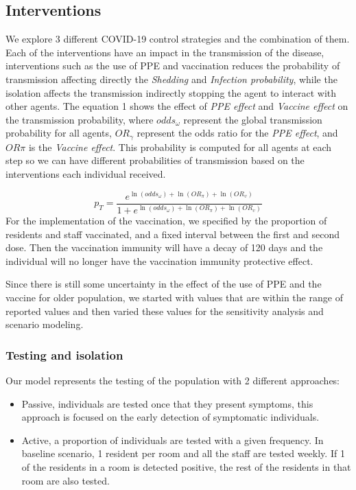 \documentclass[
]{article}
\providecommand{\tightlist}{%
  \setlength{\itemsep}{0pt}\setlength{\parskip}{0pt}}
\begin{document}
\hypertarget{interventions}{%
\subsection{Interventions}\label{interventions}}

We explore 3 different COVID-19 control strategies and the combination
of them. Each of the interventions have an impact in the transmission of
the disease, interventions such as the use of PPE and vaccination
reduces the probability of transmission affecting directly the
\emph{Shedding} and \emph{Infection probability}, while the isolation
affects the transmission indirectly stopping the agent to interact with
other agents. The equation 1 shows the effect of \emph{PPE effect} and
\emph{Vaccine effect} on the transmission probability, where
\(odds_\omega\) represent the global transmission probability for all
agents, \(OR_\gamma\) represent the odds ratio for the \emph{PPE
effect}, and \(OR\pi\) is the \emph{Vaccine effect}. This probability is
computed for all agents at each step so we can have different
probabilities of transmission based on the interventions each individual
received.

\[p_T = \frac{e^{\ln(odds_\omega) + \ln(OR_\pi)+ \ln(OR_\upsilon)}}{1 + e^{\ln(odds_\omega) + \ln(OR_\pi)+ \ln(OR_\upsilon)}}\]
For the implementation of the vaccination, we specified by the
proportion of residents and staff vaccinated, and a fixed interval
between the first and second dose. Then the vaccination immunity will
have a decay of 120 days and the individual will no longer have the
vaccination immunity protective effect.

Since there is still some uncertainty in the effect of the use of PPE
and the vaccine for older population, we started with values that are
within the range of reported values and then varied these values for the
sensitivity analysis and scenario modeling.

\hypertarget{testing-and-isolation}{%
\subsubsection{Testing and isolation}\label{testing-and-isolation}}

Our model represents the testing of the population with 2 different
approaches:

\begin{itemize}
\tightlist
\item
  Passive, individuals are tested once that they present symptoms, this
  approach is focused on the early detection of symptomatic individuals.
\item
  Active, a proportion of individuals are tested with a given frequency.
  In baseline scenario, 1 resident per room and all the staff are tested
  weekly. If 1 of the residents in a room is detected positive, the rest
  of the residents in that room are also tested.
\end{itemize}
\end{document}
